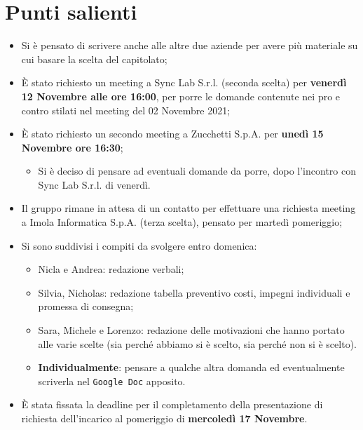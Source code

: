 \documentclass[11pt]{article}
\begin{document}
	\newpage

	\section{Punti salienti}
		\begin{itemize}
			\item Si è pensato di scrivere anche alle altre due aziende per avere più materiale
			su cui basare la scelta del capitolato;
			\item È stato richiesto un meeting a Sync Lab S.r.l. (seconda scelta) per \textbf{venerdì 12 Novembre alle ore 16:00},
			per porre le domande contenute nei pro e contro stilati nel meeting del 02 Novembre 2021;
			\item È stato richiesto un secondo meeting a Zucchetti S.p.A. per \textbf{unedì 15 Novembre ore 16:30};
			\begin{itemize}
				\item Si è deciso di pensare ad eventuali domande da porre, dopo l'incontro con Sync Lab S.r.l. di venerdì.
			\end{itemize}
			\item Il gruppo rimane in attesa di un contatto per effettuare una richiesta meeting a Imola Informatica S.p.A.
			(terza scelta), pensato per martedì pomeriggio;
			\item Si sono suddivisi i compiti da svolgere entro domenica:
				\begin{itemize}
					\item Nicla e Andrea: redazione verbali;
					\item Silvia, Nicholas: redazione tabella preventivo costi, impegni individuali e promessa di consegna;
					\item Sara, Michele e Lorenzo: redazione delle motivazioni che hanno portato alle varie scelte (sia perché
					abbiamo si è scelto, sia perché non si è scelto).
					\item \textbf{Individualmente}: pensare a qualche altra domanda ed eventualmente scriverla nel
					\texttt{Google Doc} apposito.
				\end{itemize}
			\item È stata fissata la deadline per il completamento della presentazione di richiesta dell'incarico al pomeriggio
			di \textbf{mercoledì 17 Novembre}.
		\end{itemize}
	
	

	
	
	
	
	
	
	
	
\end{document}
